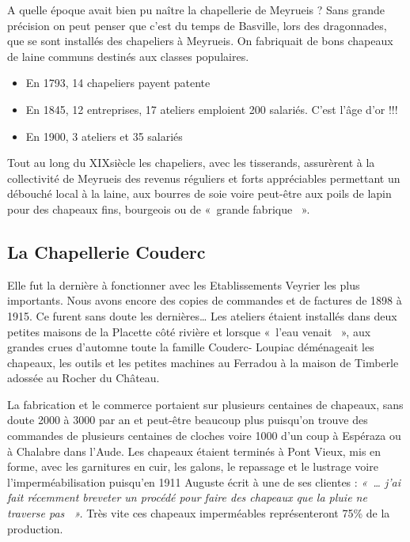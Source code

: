 


A quelle époque avait bien pu naître la chapellerie de Meyrueis ? Sans grande précision on
peut penser que c’est du temps de Basville, lors des dragonnades, que se sont installés des
chapeliers à Meyrueis. On fabriquait de bons chapeaux de laine communs destinés aux classes
populaires.\\

\begin{itemize}
\item En 1793, 14 chapeliers payent patente
\item En 1845, 12 entreprises, 17 ateliers emploient 200 salariés. C’est l’âge d’or !!!
\item En 1900, 3 ateliers et 35 salariés
\end{itemize}

\vspace{0.5em}

Tout au long du XIX\ieme siècle les chapeliers, avec les tisserands, assurèrent à la collectivité de
Meyrueis des revenus réguliers et forts appréciables permettant un débouché local à la laine,
aux bourres de soie voire peut-être aux poils de lapin pour des chapeaux fins, bourgeois ou de
«~grande fabrique ~».

\medskip

\subsection{La Chapellerie Couderc}

Elle fut la dernière à fonctionner avec les Etablissements Veyrier les plus importants. Nous
avons encore des copies de commandes et de factures de 1898 à 1915. Ce furent sans doute
les dernières… Les ateliers étaient installés dans deux petites maisons de la Placette côté
rivière et lorsque «~l’eau venait ~», aux grandes crues d’automne toute la famille Couderc-
Loupiac déménageait les chapeaux, les outils et les petites machines au Ferradou à la maison
de Timberle adossée au Rocher du Château.

\vspace{0.7em}

La fabrication et le commerce portaient sur plusieurs centaines de chapeaux, sans doute 2000 à
3000 par an et peut-être beaucoup plus puisqu’on trouve des commandes de plusieurs
centaines de cloches voire 1000 d’un coup à Espéraza ou à Chalabre dans l’Aude. Les
chapeaux étaient terminés à Pont Vieux, mis en forme, avec les garnitures en cuir, les galons,
le repassage et le lustrage voire l’imperméabilisation puisqu’en 1911 Auguste écrit à une de ses clientes : \textit{«~… j’ai fait récemment breveter un procédé pour faire des chapeaux que la pluie ne traverse pas ~».} Très vite ces chapeaux imperméables représenteront 75\% de la production.

